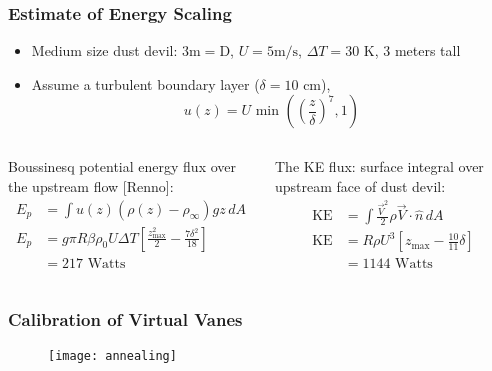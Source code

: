 \documentclass[mathserif]{beamer}
\begin{document}
%
%
\begin{frame}
  \frametitle{Estimate of Energy Scaling}
    \begin{itemize}
    \item Medium size dust devil: $3\text{m} = \text{D}$, $U =  5 \text{
	  m/s}$, $\Delta T = 30$ K, $3$ meters tall
    \item Assume a turbulent boundary layer ($\delta = 10$ cm),
      \begin{equation*}
        u(z) = U \text{ min }\left(\left(\frac{z}{\delta}\right)^7,1\right)
      \end{equation*}        
    \end{itemize}

  \begin{columns}[]
    \begin{column}{0.45\linewidth}
      Boussinesq potential energy flux over the upstream flow [Renno]:
      \begin{align*}
        E_p & = \int u(z) (\rho(z)-\rho_\infty) g z \, dA \\
        E_p & = g  \pi R \beta \rho_0 U \Delta T \left[ \frac{z_\text{max}^2}{2} - \frac{7 \delta^2}{18} \right] \\
       & = 217 \text{ Watts}
      \end{align*}

    \end{column}
    \begin{column}{0.55\linewidth}
      The KE flux:  surface integral over upstream face of dust devil: 
      \begin{align*}
        \text{KE} & = \int \frac{\vec V^2}{2} \rho \vec V \cdot \hat n \, dA \\
        \text{KE} & = R \rho U^3 \left[ z_{\text{max}} - \frac{10}{11}\delta \right] \\
        & = 1144 \text{ Watts}
      \end{align*}
    \end{column}
  \end{columns}
\end{frame}


%
%
%
\begin{frame}
\frametitle{Calibration of Virtual Vanes}

    \begin{figure}[htb]
     \centering
     \texttt{[image: annealing]}
    \end{figure}
\end{frame}
\end{document}

